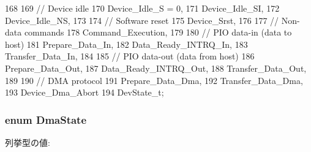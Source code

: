 \begin{DoxyCode}
168                       {
169     // Device idle
170     Device_Idle_S = 0,
171     Device_Idle_SI,
172     Device_Idle_NS,
173 
174     // Software reset
175     Device_Srst,
176 
177     // Non-data commands
178     Command_Execution,
179 
180     // PIO data-in (data to host)
181     Prepare_Data_In,
182     Data_Ready_INTRQ_In,
183     Transfer_Data_In,
184 
185     // PIO data-out (data from host)
186     Prepare_Data_Out,
187     Data_Ready_INTRQ_Out,
188     Transfer_Data_Out,
189 
190     // DMA protocol
191     Prepare_Data_Dma,
192     Transfer_Data_Dma,
193     Device_Dma_Abort
194 } DevState_t;
\end{DoxyCode}
\hypertarget{ide__disk_8hh_a8adb9656d6ea50580adaf9c8e7d9eebf}{
\subsubsection[{DmaState}]{\setlength{\rightskip}{0pt plus 5cm}enum {\bf DmaState}}}
\label{ide__disk_8hh_a8adb9656d6ea50580adaf9c8e7d9eebf}
\begin{Desc}
\item[列挙型の値: ]\par
\begin{description}
\item[{\em 
\hypertarget{ide__disk_8hh_a8adb9656d6ea50580adaf9c8e7d9eebfa98b4f39d2f8dca680f8b1ac92943966c}{
Dma\_\-Idle}
\label{ide__disk_8hh_a8adb9656d6ea50580adaf9c8e7d9eebfa98b4f39d2f8dca680f8b1ac92943966c}
}]\item[{\em 
\hypertarget{ide__disk_8hh_a8adb9656d6ea50580adaf9c8e7d9eebfae35abb19ade6161b3817f6dd498ca711}{
Dma\_\-Start}
\label{ide__disk_8hh_a8adb9656d6ea50580adaf9c8e7d9eebfae35abb19ade6161b3817f6dd498ca711}
}]\item[{\em 
\hypertarget{ide__disk_8hh_a8adb9656d6ea50580adaf9c8e7d9eebfa1479e31de2b235a422d366215ade33d4}{
Dma\_\-Transfer}
\label{ide__disk_8hh_a8adb9656d6ea50580adaf9c8e7d9eebfa1479e31de2b235a422d366215ade33d4}
}]\end{description}
\end{Desc}




